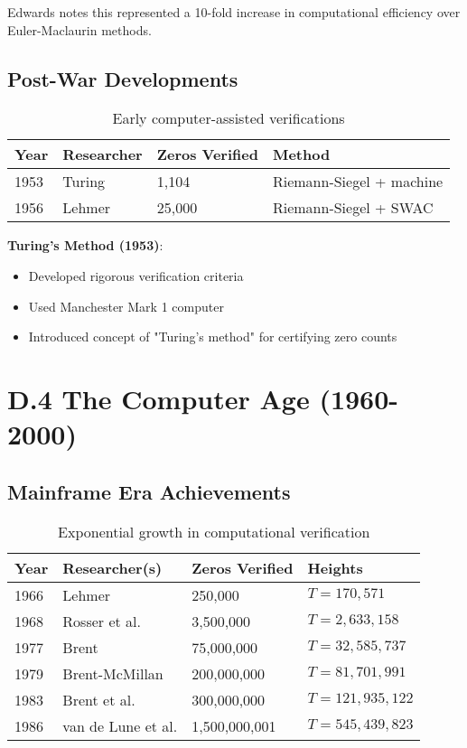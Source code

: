 Edwards \cite{edwards1974} notes this represented a 10-fold increase in computational efficiency over Euler-Maclaurin methods.

\subsection{Post-War Developments}

\begin{table}[h]
\centering
\begin{tabular}{|l|l|l|l|}
\hline
\textbf{Year} & \textbf{Researcher} & \textbf{Zeros Verified} & \textbf{Method} \\
\hline
1953 & Turing & 1,104 & Riemann-Siegel + machine \\
1956 & Lehmer & 25,000 & Riemann-Siegel + SWAC \\
\hline
\end{tabular}
\caption{Early computer-assisted verifications}
\end{table}

\textbf{Turing's Method (1953)}:
\begin{itemize}
\item Developed rigorous verification criteria
\item Used Manchester Mark 1 computer
\item Introduced concept of "Turing's method" for certifying zero counts
\end{itemize}

\section{D.4 The Computer Age (1960-2000)}

\subsection{Mainframe Era Achievements}

\begin{table}[h]
\centering
\begin{tabular}{|l|l|l|l|}
\hline
\textbf{Year} & \textbf{Researcher(s)} & \textbf{Zeros Verified} & \textbf{Heights} \\
\hline
1966 & Lehmer & 250,000 & $T = 170,571$ \\
1968 & Rosser et al. & 3,500,000 & $T = 2,633,158$ \\
1977 & Brent & 75,000,000 & $T = 32,585,737$ \\
1979 & Brent-McMillan & 200,000,000 & $T = 81,701,991$ \\
1983 & Brent et al. & 300,000,000 & $T = 121,935,122$ \\
1986 & van de Lune et al. & 1,500,000,001 & $T = 545,439,823$ \\
\hline
\end{tabular}
\caption{Exponential growth in computational verification}
\end{table}

